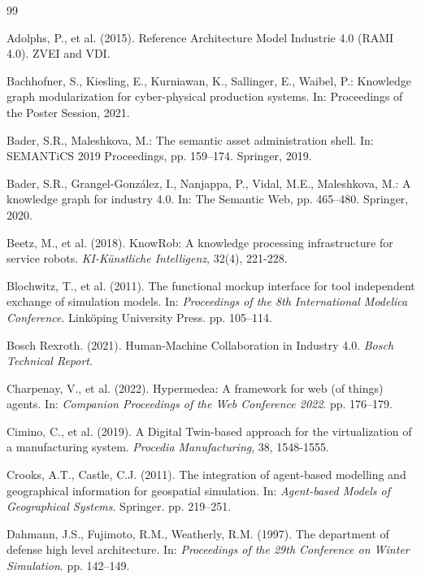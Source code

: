 \documentclass{article} %
\begin{document}
\clearpage
\pagestyle{empty}
\begin{thebibliography}{99}

Adolphs, P., et al. (2015). Reference Architecture Model Industrie 4.0 (RAMI 4.0). ZVEI and VDI.

Bachhofner, S., Kiesling, E., Kurniawan, K., Sallinger, E., Waibel, P.: Knowledge graph modularization for cyber-physical production systems. In: Proceedings of the Poster Session, 2021.

Bader, S.R., Maleshkova, M.: The semantic asset administration shell. In: SEMANTiCS 2019 Proceedings, pp. 159–174. Springer, 2019.

Bader, S.R., Grangel-González, I., Nanjappa, P., Vidal, M.E., Maleshkova, M.: A knowledge graph for industry 4.0. In: The Semantic Web, pp. 465–480. Springer, 2020.

Beetz, M., et al. (2018). KnowRob: A knowledge processing infrastructure for service robots. \emph{KI-Künstliche Intelligenz}, 32(4), 221-228.

Blochwitz, T., et al. (2011). The functional mockup interface for tool independent exchange of simulation models. In: \emph{Proceedings of the 8th International Modelica Conference}. Linköping University Press. pp. 105–114.

Bosch Rexroth. (2021). Human-Machine Collaboration in Industry 4.0. \emph{Bosch Technical Report}.

Charpenay, V., et al. (2022). Hypermedea: A framework for web (of things) agents. In: \emph{Companion Proceedings of the Web Conference 2022}. pp. 176–179.

Cimino, C., et al. (2019). A Digital Twin-based approach for the virtualization of a manufacturing system. \emph{Procedia Manufacturing}, 38, 1548-1555.

Crooks, A.T., Castle, C.J. (2011). The integration of agent-based modelling and geographical information for geospatial simulation. In: \emph{Agent-based Models of Geographical Systems}. Springer. pp. 219–251.

Dahmann, J.S., Fujimoto, R.M., Weatherly, R.M. (1997). The department of defense high level architecture. In: \emph{Proceedings of the 29th Conference on Winter Simulation}. pp. 142–149.


\end{thebibliography}
\end{document}
